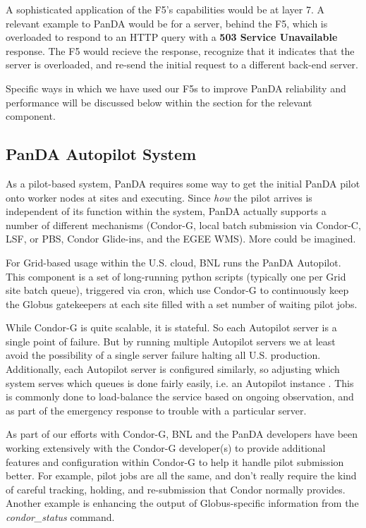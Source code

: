 \documentclass[letterpaper]{jpconf}
\begin{document}
A sophisticated application of the F5's capabilities would be at layer 7. A
relevant example to PanDA would be for a server, behind the F5, which is
overloaded to respond to an HTTP query with a {\bf 503 Service Unavailable}
response. The F5 would recieve the response, recognize that it indicates that
the server is overloaded, and re-send the initial request to a different
back-end server. 

Specific ways in which we have used our F5s to improve PanDA reliability and
performance will be discussed below within the section for the relevant
component.


\subsection{PanDA Autopilot System}

As a pilot-based system, PanDA requires some way to get the initial PanDA pilot
onto worker nodes at sites and executing. Since {\it how} the pilot arrives is
independent of its function within the system, PanDA actually supports a number
of different mechanisms (Condor-G, local batch submission via Condor-C, LSF, or
PBS, Condor Glide-ins, and the EGEE WMS). More could be imagined.

For Grid-based usage within the U.S. cloud, BNL runs the PanDA Autopilot. This
component is a set of long-running python scripts (typically one per Grid site
batch queue), triggered via cron, which use Condor-G \cite{condorsite} to 
continuously keep the Globus gatekeepers at each site filled with a set 
number of waiting pilot jobs. 

While Condor-G is quite scalable, it is stateful. So each Autopilot server is
a single point of failure. But by running multiple Autopilot servers we at least
avoid the possibility of a single server failure halting all U.S. production.
Additionally, each Autopilot server is configured similarly, so adjusting which
system serves which queues is done fairly easily, i.e. an Autopilot instance .
This is commonly done to load-balance the service based on ongoing observation, and 
as part of the emergency response to trouble with a particular server.

As part of our efforts with Condor-G, BNL and the PanDA developers have been
working extensively with the Condor-G developer(s) to provide additional
features and configuration within Condor-G to help it handle pilot submission
better. For example, pilot jobs are all the same, and don't really require the
kind of careful tracking, holding, and re-submission that Condor normally
provides. Another example is enhancing the output of Globus-specific
information from the {\it condor\_status} command. 
\end{document}
